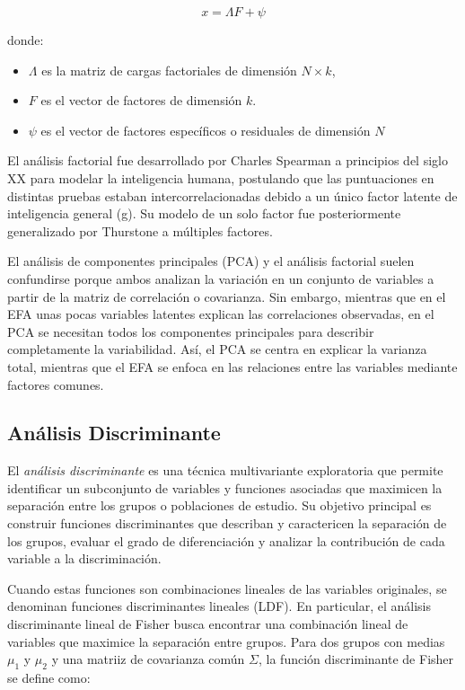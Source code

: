 \[
x=\Lambda F + \psi
\]

donde:

\begin{itemize}
    \item $\Lambda$ es la matriz de cargas factoriales de dimensión $N \times k$,
    \item $F$ es el vector de factores de dimensión $k$.
    \item $\psi$ es el vector de factores específicos o residuales de dimensión $N$
\end{itemize}

El análisis factorial fue desarrollado por Charles Spearman a principios del siglo XX para modelar la inteligencia humana, 
postulando que las puntuaciones en distintas pruebas estaban intercorrelacionadas debido a un único factor latente de inteligencia 
general (g). Su modelo de un solo factor fue posteriormente generalizado por Thurstone a múltiples factores. \newline

El análisis de componentes principales (PCA)  y el análisis factorial suelen confundirse porque ambos analizan 
la variación en un conjunto de variables a partir de la matriz de correlación o covarianza. Sin embargo, mientras que en el EFA unas 
pocas variables latentes explican las correlaciones observadas, en el PCA se necesitan todos los componentes principales para describir 
completamente la variabilidad. Así, el PCA se centra en explicar la varianza total, mientras que el EFA se enfoca en las relaciones 
entre las variables mediante factores comunes. 



\subsection{Análisis Discriminante}

El \textit{análisis discriminante} es una técnica multivariante exploratoria que permite identificar un subconjunto de variables y funciones
asociadas que maximicen la separación entre los grupos o poblaciones de estudio. Su objetivo principal es construir funciones
discriminantes que describan y caractericen la separación de los grupos, evaluar el grado de diferenciación y analizar la contribución
de cada variable a la discriminación. \newline

Cuando estas funciones son combinaciones lineales de las variables originales, se denominan funciones discriminantes lineales (LDF). En
particular, el análisis discriminante lineal de Fisher busca encontrar una combinación lineal de variables que maximice la separación
entre grupos. Para dos grupos con medias $\mu_{1}$ y $\mu_{2}$ y una matriiz de covarianza común $\Sigma$, la función discriminante de Fisher
se define como:


